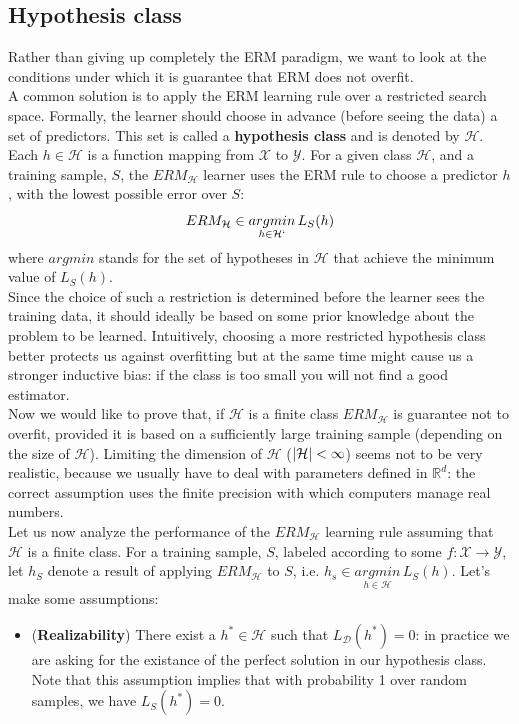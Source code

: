 \documentclass[12pt]{report}
\theoremstyle{plain}
\newcommand\mcl[1]{\mathcal{#1}}
\begin{document}
\begin{flushleft}
\section{Hypothesis class}
Rather than giving up completely the ERM paradigm, we want to look at the conditions under which it is guarantee that ERM does not overfit.\\
A common solution is to apply the ERM learning rule over a restricted search space. Formally, the learner should choose in advance (before seeing the data) a set of predictors. This set is called a \textbf{hypothesis class} and is denoted by $\mcl{H}$. Each $h\in\mcl{H}$ is a function mapping from $\mcl{X}$ to $\mcl{Y}$. For a given class $\mcl{H}$, and a training sample, $S$, the $ERM_\mcl{H}$ learner uses the ERM rule to choose a predictor $h$, with the lowest possible error over $S$:
\begin{equation}
ERM_\mcl{H} \in \underset{h\in\mcl{H`}}{argmin}\, L_S(h)
\label{eq:ERMH}
\end{equation}
where $argmin$ stands for the set of hypotheses in $\mcl{H}$ that achieve the minimum value of $L_S(h)$.\\
Since the choice of such a restriction is determined before the learner sees the training data, it should ideally be based on some prior knowledge about the problem to be learned. Intuitively, choosing a more restricted hypothesis class better protects us against overfitting but at the same time might cause us a stronger inductive bias: if the class is too small you will not find a good estimator.\\
Now we would like to prove that, if $\mcl{H}$ is a finite class $ERM_\mcl{H}$ is guarantee not to overfit, provided it is based on a sufficiently large training sample (depending on the size of $\mcl{H}$). Limiting the dimension of $\mcl{H}$ ($\abs{\mcl{H}} < \infty$) seems not to be very realistic, because we usually have to deal with parameters defined in $\mathds{R}^d$: the correct assumption uses the finite precision with which computers manage real numbers.\\
Let us now analyze the performance of the $ERM_\mcl{H}$ learning rule assuming that $\mcl{H}$ is a finite class. For a training sample, $S$, labeled according to some $f:\mcl{X}\to\mcl{Y}$, let $h_S$ denote a result of applying $ERM_\mcl{H}$ to $S$, i.e. $h_s\in \underset{h\in\mcl{H}}{argmin}\, L_S(h)$. Let's make some assumptions:
\begin{itemize}
\item (\textbf{Realizability}) There exist a $h^*\in\mcl{H}$ such that $L_\mcl{D}(h^*)=0$: in practice we are asking for the existance of the perfect solution in our hypothesis class. Note that this assumption implies that with probability 1 over random samples, we have $L_S(h^*)=0$.

\end{itemize}
\end{flushleft}
\end{document}
